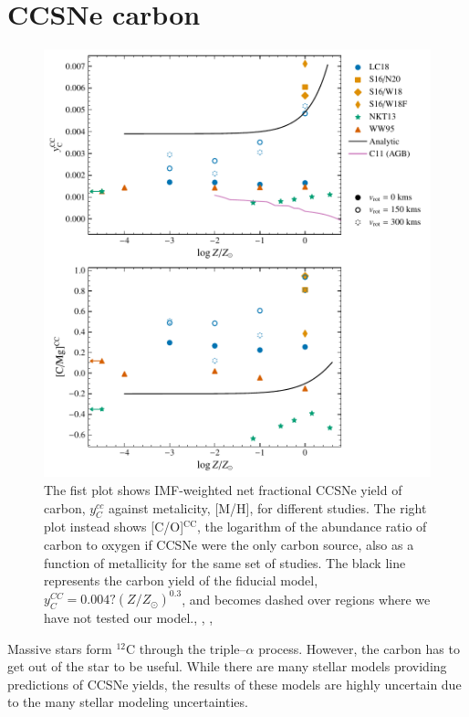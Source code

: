 \documentclass[12pt,oneside]{report}
\newcommand{\sun}{\ensuremath{\odot}}
\begin{document}
\section{CCSNe carbon}

\begin{figure}[htp]
    \centering
    \includegraphics{y_c_cc.pdf}
    \caption[CCSNe carbon yields]{The fist plot shows IMF-weighted net fractional CCSNe yield of
        carbon, $y_C^{cc}$ against metalicity, [M/H], for different studies.
        The right plot instead shows [C/O]$^\text{CC}$, the logarithm of the
        abundance ratio of carbon to oxygen if CCSNe were the only carbon
        source, also as a function of metallicity for the same set of studies.
        The black line represents the carbon yield of the fiducial model,
        $y_C^{CC} = 0.004? (Z/Z_{\sun})^{0.3}$, and becomes dashed over regions
        where we have not tested our model.\citep{NKT13}, \citep{LC18},
        \citep{sukhbold+16}, \citep{WW95}
 }
    \label{fig:y_cc}
\end{figure}

Massive stars form $^{12}$C through the triple--$\alpha$ process. However, the carbon has to get out of the star to be useful. 
While there are many stellar models providing predictions of CCSNe yields, the results of these models are highly uncertain due to the many stellar modeling uncertainties. 
\end{document}
